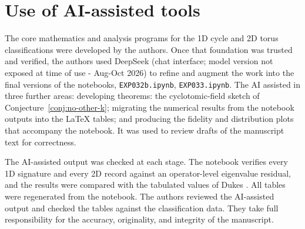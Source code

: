 \par\section*{Use of AI-assisted tools}
\label{sec:ai-disclosure}
The core mathematics and analysis programs for the 1D cycle and 2D
torus classifications were developed by the authors. Once that
foundation was trusted and verified, the authors used DeepSeek (chat interface;
model version not exposed at time of use - Aug-Oct 2026) to refine and 
augment the work into the final versions  of the  notebooks, \texttt{EXP032b.ipynb}, 
\texttt{EXP033.ipynb}. 
The AI assisted in three further areas: developing theorems: the cyclotomic-field
sketch of Conjecture~\ref{conj:no-other-k}; migrating the numerical
results from the notebook outputs into the LaTeX tables; and producing the 
fidelity and distribution plots that accompany the notebook. 
It was used to review drafts of the manuscript text for correctness.

The AI-assisted output was checked at each stage. The notebook
verifies every 1D signature and every 2D record against an
operator-level eigenvalue residual, and the results were compared
with the tabulated values of Dukes \cite{Dukes2014}. All tables were
regenerated from the notebook. The authors reviewed the AI-assisted output
and checked the tables against the classification data.
They take full responsibility for the accuracy,
originality, and integrity of the manuscript.
